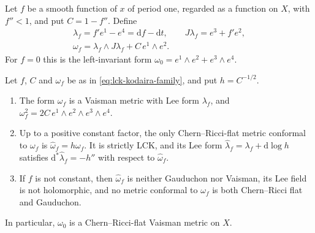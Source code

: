 Let $f$ be a smooth function of $x$ of period one, regarded as a function on $X$, with $f''<1$, and put $C=1-f''$. Define
\begin{equation}\label{eq:lck-kodaira-family}
 \begin{gathered}
 \lambda_f=f'e^1-e^4=\mathrm df-\mathrm dt,\qquad
 J\lambda_f=e^3+f'e^2,\\
 \omega_f=\lambda_f\wedge J\lambda_f+C\,e^1\wedge e^2.
 \end{gathered}
\end{equation}
For $f=0$ this is the left-invariant form $\omega_0=e^1\wedge e^2+e^3\wedge e^4$.

\begin{proposition}\label{prop:lck-kodaira-flat-gauge}
Let $f$, $C$ and $\omega_f$ be as in \eqref{eq:lck-kodaira-family}, and put $h=C^{-1/2}$.
\begin{enumerate}[label=\textup{(\roman*)},leftmargin=*,itemsep=.2em,topsep=.3em]
\item The form $\omega_f$ is a Vaisman metric with Lee form $\lambda_f$, and $\omega_f^2=2C\,e^1\wedge e^2\wedge e^3\wedge e^4$.
\item Up to a positive constant factor, the only Chern--Ricci-flat metric conformal to $\omega_f$ is $\widehat\omega_f=h\omega_f$. It is strictly LCK, and its Lee form $\widehat\lambda_f=\lambda_f+\mathrm d\log h$ satisfies $\mathrm d^*\widehat\lambda_f=-h''$ with respect to $\widehat\omega_f$.
\item If $f$ is not constant, then $\widehat\omega_f$ is neither Gauduchon nor Vaisman, its Lee field is not holomorphic, and no metric conformal to $\omega_f$ is both Chern--Ricci flat and Gauduchon.
\end{enumerate}
In particular, $\omega_0$ is a Chern--Ricci-flat Vaisman metric on $X$.
\end{proposition}
